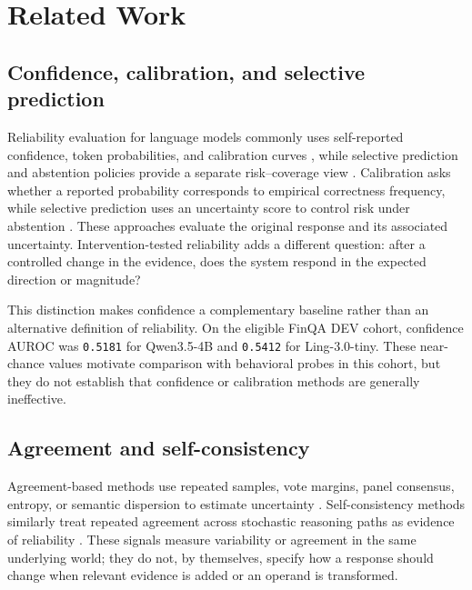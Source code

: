 \documentclass[11pt]{article}
\begin{document}
\section{Related Work}

\subsection{Confidence, calibration, and selective prediction}

Reliability evaluation for language models commonly uses self-reported confidence, token probabilities, and calibration curves \citep{guo-etal-2017-calibration,kuhn-etal-2023-semantic-uncertainty}, while selective prediction and abstention policies provide a separate risk--coverage view \citep{geifman-elyaniv-2017-selective}. Calibration asks whether a reported probability corresponds to empirical correctness frequency, while selective prediction uses an uncertainty score to control risk under abstention \citep{guo-etal-2017-calibration,geifman-elyaniv-2017-selective}. These approaches evaluate the original response and its associated uncertainty. Intervention-tested reliability adds a different question: after a controlled change in the evidence, does the system respond in the expected direction or magnitude?

This distinction makes confidence a complementary baseline rather than an alternative definition of reliability. On the eligible FinQA DEV cohort, confidence AUROC was \texttt{0.5181} for Qwen3.5-4B and \texttt{0.5412} for Ling-3.0-tiny. These near-chance values motivate comparison with behavioral probes in this cohort, but they do not establish that confidence or calibration methods are generally ineffective.

\subsection{Agreement and self-consistency}

Agreement-based methods use repeated samples, vote margins, panel consensus, entropy, or semantic dispersion to estimate uncertainty \citep{wang-etal-2022-self-consistency,manakul-etal-2023-selfcheckgpt,kuhn-etal-2023-semantic-uncertainty}. Self-consistency methods similarly treat repeated agreement across stochastic reasoning paths as evidence of reliability \citep{wang-etal-2022-self-consistency}. These signals measure variability or agreement in the same underlying world; they do not, by themselves, specify how a response should change when relevant evidence is added or an operand is transformed.
\end{document}
